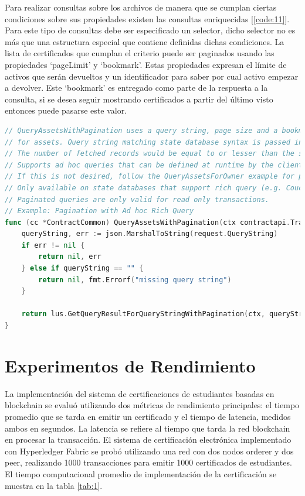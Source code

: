 Para realizar consultas sobre los archivos de manera que se cumplan ciertas condiciones sobre sus propiedades existen las consultas enriquecidas [\ref{code:11}]. Para este tipo de consultas debe ser especificado un selector, dicho selector no es más que una estructura especial que contiene definidas dichas condiciones. La lista de certificados que cumplan el criterio puede ser paginados usando las propiedades `pageLimit' y `bookmark'. Estas propiedades expresan el límite de activos que serán devueltos y un identificador para saber por cual activo empezar a devolver. Este `bookmark' es entregado como parte de la respuesta a la consulta, si se desea seguir mostrando certificados a partir del último visto entonces puede pasarse este valor.

\begin{lstlisting}[language=Go,caption={Código del archivo App.vue}, label={code:11}]
// QueryAssetsWithPagination uses a query string, page size and a bookmark to perform a query
// for assets. Query string matching state database syntax is passed in and executed as is.
// The number of fetched records would be equal to or lesser than the specified page size.
// Supports ad hoc queries that can be defined at runtime by the client.
// If this is not desired, follow the QueryAssetsForOwner example for parameterized queries.
// Only available on state databases that support rich query (e.g. CouchDB)
// Paginated queries are only valid for read only transactions.
// Example: Pagination with Ad hoc Rich Query
func (cc *ContractCommon) QueryAssetsWithPagination(ctx contractapi.TransactionContextInterface, request lus.RichQuerySelector) (*lus.PaginatedQueryResponse, error) {
	queryString, err := json.MarshalToString(request.QueryString)
	if err != nil {
		return nil, err
	} else if queryString == "" {
		return nil, fmt.Errorf("missing query string")
	}
	
	return lus.GetQueryResultForQueryStringWithPagination(ctx, queryString, int32(request.PageSize), request.Bookmark)
}
\end{lstlisting}

\section{Experimentos de Rendimiento}

La implementación del sistema de certificaciones de estudiantes basadas en blockchain se evaluó utilizando dos métricas de rendimiento principales: el tiempo promedio que se tarda en emitir un certificado y el tiempo de latencia, medidos ambos en segundos. La latencia se refiere al tiempo que tarda la red blockchain en procesar la transacción. El sistema de certificación electrónica implementado con Hyperledger Fabric se probó utilizando una red con dos nodos orderer y dos peer, realizando 1000 transacciones para emitir 1000 certificados de estudiantes. El tiempo computacional promedio de implementación de la certificación se muestra en la tabla \ref{tab:1}.

